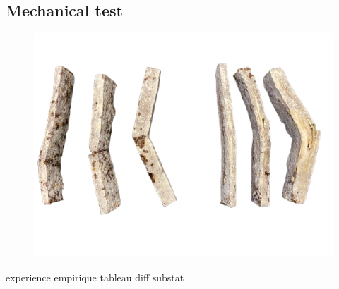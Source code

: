 \subsection{Mechanical test}


\begin{figure}[h]
    \centering
    \includegraphics{images/IMG_1823-removebg-preview.png}
    \caption{}
    \label{fig:eprouvette}
\end{figure} 

experience empirique 
tableau diff substat 